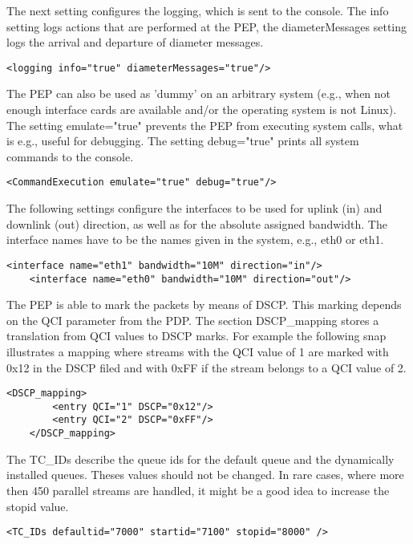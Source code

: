 The next setting configures the logging, which is sent to the console.
The info setting logs actions that are performed at the PEP, the diameterMessages setting logs the arrival and departure of diameter messages.
\begin{lstlisting}[caption=Enable Logging, label={lst:PEPContainer}]	
	<logging info="true" diameterMessages="true"/> 
\end{lstlisting}

The PEP can also be used as 'dummy' on an arbitrary system (e.g., when not enough interface cards are available and/or the operating system is not Linux).
The setting emulate="true" prevents the PEP from executing system calls, what is e.g., useful for debugging.
The setting debug="true" prints all system commands to the console.
\begin{lstlisting}[caption=Enable Emulation, label={lst:PEPContainer}]	
	<CommandExecution emulate="true" debug="true"/>  
\end{lstlisting}

The following settings configure the interfaces to be used for uplink (in) and downlink (out) direction, as well as for the absolute assigned bandwidth.
The interface names have to be the names given in the system, e.g.,  eth0 or eth1.
\begin{lstlisting}[caption=Interface configuration, label={lst:PEPContainer}]	
	<interface name="eth1" bandwidth="10M" direction="in"/>  
	<interface name="eth0" bandwidth="10M" direction="out"/>  
\end{lstlisting}

The PEP is able to mark the packets by means of DSCP. This marking depends on the QCI parameter from the PDP. 
The section DSCP\_mapping stores a translation from QCI values to DSCP marks. 
For example the following snap illustrates a mapping where streams with the QCI value of 1 are marked with 0x12 in the DSCP filed and with 0xFF if the stream belongs to a QCI  value of 2.
\begin{lstlisting}[caption=DSCP mapping, label={lst:PEPContainer}]	
	<DSCP_mapping>
		<entry QCI="1" DSCP="0x12"/>
		<entry QCI="2" DSCP="0xFF"/>
	</DSCP_mapping>
\end{lstlisting}

The TC\_IDs describe the queue ids for the default queue and the dynamically installed queues. Theses values should not be changed. In rare cases, where more then 450 parallel streams are handled, it might be a good idea to increase the stopid value.
\begin{lstlisting}[caption=TC ids, label={lst:PEPContainer}]	
	<TC_IDs defaultid="7000" startid="7100" stopid="8000" />
\end{lstlisting}

